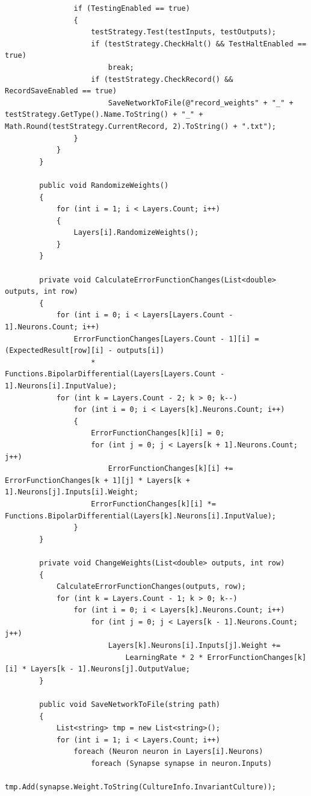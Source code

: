 \documentclass[12pt,a4paper]{article}
\begin{document}
\begin{lstlisting}
                if (TestingEnabled == true)
                {
                    testStrategy.Test(testInputs, testOutputs);
                    if (testStrategy.CheckHalt() && TestHaltEnabled == true)
                        break;
                    if (testStrategy.CheckRecord() && RecordSaveEnabled == true)
                        SaveNetworkToFile(@"record_weights" + "_" + testStrategy.GetType().Name.ToString() + "_" + Math.Round(testStrategy.CurrentRecord, 2).ToString() + ".txt");
                }
            }
        }

        public void RandomizeWeights()
        {
            for (int i = 1; i < Layers.Count; i++)
            {
                Layers[i].RandomizeWeights();
            }
        }

        private void CalculateErrorFunctionChanges(List<double> outputs, int row)
        {
            for (int i = 0; i < Layers[Layers.Count - 1].Neurons.Count; i++)
                ErrorFunctionChanges[Layers.Count - 1][i] = (ExpectedResult[row][i] - outputs[i])
                    * Functions.BipolarDifferential(Layers[Layers.Count - 1].Neurons[i].InputValue);
            for (int k = Layers.Count - 2; k > 0; k--)
                for (int i = 0; i < Layers[k].Neurons.Count; i++)
                {
                    ErrorFunctionChanges[k][i] = 0;
                    for (int j = 0; j < Layers[k + 1].Neurons.Count; j++)
                        ErrorFunctionChanges[k][i] += ErrorFunctionChanges[k + 1][j] * Layers[k + 1].Neurons[j].Inputs[i].Weight;
                    ErrorFunctionChanges[k][i] *= Functions.BipolarDifferential(Layers[k].Neurons[i].InputValue);
                }
        }

        private void ChangeWeights(List<double> outputs, int row)
        {
            CalculateErrorFunctionChanges(outputs, row);
            for (int k = Layers.Count - 1; k > 0; k--)
                for (int i = 0; i < Layers[k].Neurons.Count; i++)
                    for (int j = 0; j < Layers[k - 1].Neurons.Count; j++)
                        Layers[k].Neurons[i].Inputs[j].Weight +=
                            LearningRate * 2 * ErrorFunctionChanges[k][i] * Layers[k - 1].Neurons[j].OutputValue;
        }

        public void SaveNetworkToFile(string path)
        {
            List<string> tmp = new List<string>();
            for (int i = 1; i < Layers.Count; i++)
                foreach (Neuron neuron in Layers[i].Neurons)
                    foreach (Synapse synapse in neuron.Inputs)
                        tmp.Add(synapse.Weight.ToString(CultureInfo.InvariantCulture));
            

\end{lstlisting}
\end{document}
